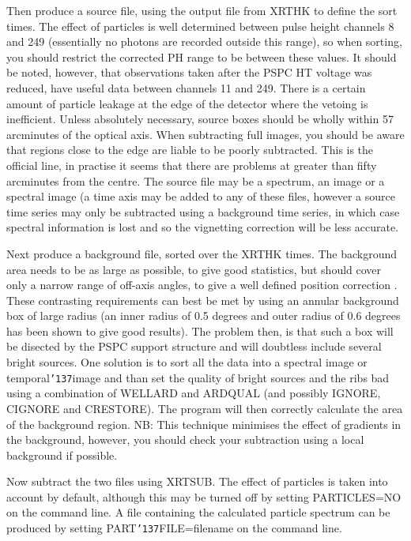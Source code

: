 \documentclass{book}
\renewcommand{\_}{{\tt\char'137}}     %
\begin{document}
Then produce a source file, using the output file from XRTHK to
define the sort times. The effect of particles is well determined
between pulse height channels 8 and 249 (essentially no photons are
recorded outside this range), so when sorting, you should restrict
the corrected PH range to be between these values. It should be
noted, however, that observations taken after the PSPC HT voltage
was reduced, have useful data between channels 11 and 249. There is a
certain amount of particle leakage at the edge of the detector where
the vetoing is inefficient. Unless absolutely necessary, source boxes
should be wholly within 57 arcminutes of the optical axis. When
subtracting full images, you should be aware that regions close to
the edge are liable to be poorly subtracted. This is the official
line, in practise it seems that there are problems at greater than
fifty arcminutes from the centre. The source file may be a spectrum,
an image or a spectral image (a time axis may be added to any of
these files, however a source time series may only be subtracted
using a background time series, in which case spectral information
is lost and so the vignetting correction will be less accurate.

Next produce a background file, sorted over the XRTHK times.
The background area needs to be as large as possible, to give
good statistics, but should cover only a narrow range of off-axis
angles, to give a well defined position correction . These
contrasting requirements can best be met by using an annular
background box of large radius (an inner radius of 0.5 degrees and
outer radius of 0.6 degrees has been shown to give good results).
The problem then, is that such a box will be disected
by the PSPC support structure and will doubtless include
several bright sources. One solution is to sort all the data
into a spectral image or temporal\_image and than set the quality of
bright sources and the ribs bad using a combination of WELLARD and
ARDQUAL (and possibly IGNORE, CIGNORE and CRESTORE). The program will
then correctly calculate the area of the background region. NB: This
technique minimises the effect of gradients in the background,
however, you should check your subtraction using a local background
if possible.

Now subtract the two files using XRTSUB. The effect of particles is
taken into account by default, although this may be turned off by
setting PARTICLES=NO on the command line. A file containing the
calculated particle spectrum can be produced by setting
PART\_FILE=filename on the command line.
\end{document}
